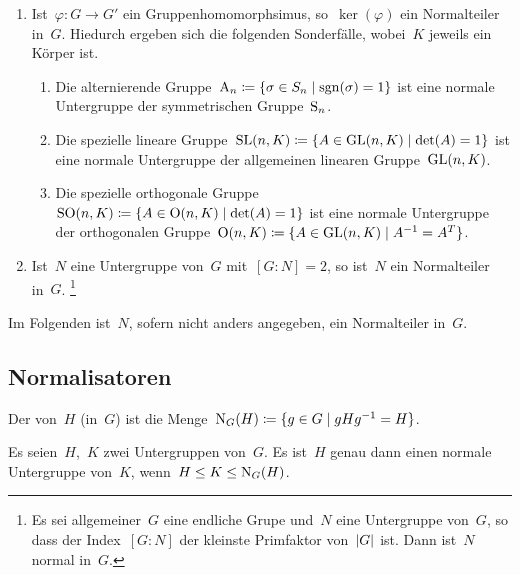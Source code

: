 \begin{example}
  \leavevmode
  \begin{enumerate}
    \item
      Ist~$\varphi \colon G \to G'$ ein Gruppenhomomorphsimus, so~$\ker(\varphi)$ ein Normalteiler in~$G$.
      Hiedurch ergeben sich die folgenden Sonderfälle, wobei~$K$ jeweils ein Körper ist.
      \begin{enumerate}
        \item
          Die alternierende Gruppe~$\Alt_n \defined \{ \sigma \in S_n \suchthat \sgn(\sigma) = 1 \}$ ist eine normale Untergruppe der symmetrischen Gruppe~$\operatorname{S}_n$.
        \item
          Die spezielle lineare Gruppe~$\SL(n,K) \defined \{ A \in \GL(n,K) \suchthat \det(A) = 1 \}$ ist eine normale Untergruppe der allgemeinen linearen Gruppe~$\operatorname{GL}(n,K)$.
        \item
          Die spezielle orthogonale Gruppe~$\SOrth(n,K) \defined \{ A \in \Orth(n,K) \suchthat \det(A) = 1 \}$ ist eine normale Untergruppe der orthogonalen Gruppe~$\Orth(n,K) \defined \{ A \in \GL(n,K) \suchthat A^{-1} = A^T \}$.
      \end{enumerate}
    \item
      Ist~$N$ eine Untergruppe von~$G$ mit~$[G : N] = 2$, so ist~$N$ ein Normalteiler in~$G$.%
      \footnote{
        Es sei allgemeiner~$G$ eine endliche Grupe und~$N$ eine Untergruppe von~$G$, so dass der Index~$[G : N]$ der kleinste Primfaktor von~$\lvert G\rvert$ ist.
        Dann ist~$N$ normal in~$G$.
      }
  \end{enumerate}
\end{example}

\begin{convention}
  Im Folgenden ist~$N$, sofern nicht anders angegeben, ein Normalteiler in~$G$.
\end{convention}




\subsection{Normalisatoren}

\begin{definition}
  Der  von~$H$ (in~$G$) ist die Menge~$\normalizer_G(H) \defined \{ g \in G \suchthat g H g^{-1} = H \}$.
\end{definition}

\begin{proposition}
  Es seien~$H$,~$K$ zwei Untergruppen von~$G$.
  Es ist~$H$ genau dann einen normale Untergruppe von~$K$, wenn~$H \leq K \leq \operatorname{N}_G(H)$.
\end{proposition}

